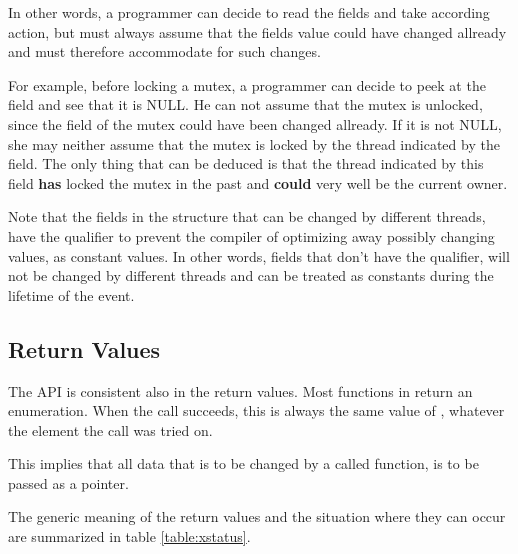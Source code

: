 In other words, a programmer can decide to read the fields and take
according action, but must always assume that the fields value could
have changed allready and must therefore accommodate for such changes.

For example, before locking a mutex, a programmer can decide to peek at the
field  and see that it is NULL. He can
not assume that the mutex is unlocked, since the  field of the
mutex could have been changed allready. If it is not NULL, she may neither
assume that the mutex is locked by the thread indicated by the
 field. The only thing that can be
deduced is that the thread indicated by this field \textbf{has} locked the mutex in
the past and \textbf{could} very well be the current owner.

Note that the fields in the structure that can be changed by different
threads, have the qualifier  to prevent the compiler of
optimizing away possibly changing values, as constant values. In other
words, fields that don't have the  qualifier, will not be
changed by different threads and can be treated as constants during the
lifetime of the event.

\subsection{Return Values}

The API is consistent also in the return values. Most functions in \oswald return
an  enumeration. When the call succeeds, this is always the
same value of , whatever the element the call was tried on.

This implies that all data that is to be changed by a called function, is to
be passed as a pointer.

The generic meaning of the return values and the situation where they can occur are summarized 
in table \ref{table:xstatus}.

